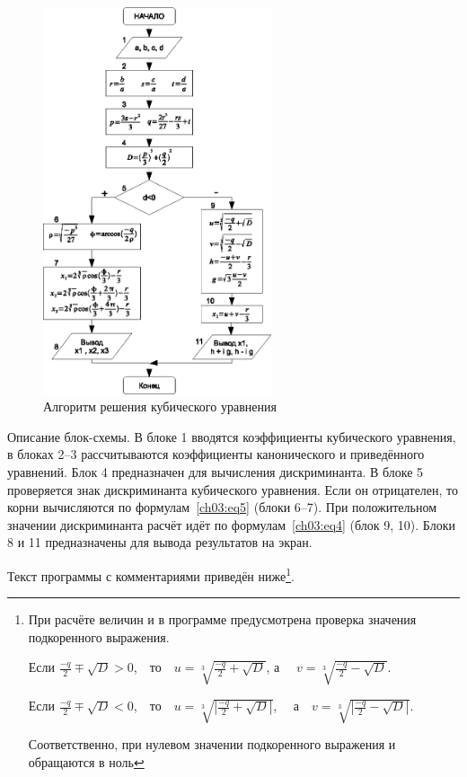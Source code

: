 \begin{figure}[ht]
\begin{center}
\includegraphics[width=0.6\textwidth]{img/ris_3_19}
\caption{Алгоритм решения кубического уравнения}
\label{ch03:refDrawing18}
\end{center}
\end{figure}

Описание блок-схемы. В блоке 1 вводятся коэффициенты кубического уравнения, в блоках 2--3 рассчитываются коэффициенты
канонического и приведённого уравнений. Блок 4 предназначен для вычисления дискриминанта. В блоке 5 проверяется знак
дискриминанта кубического уравнения. Если он отрицателен, то корни вычисляются по формулам~\ref{ch03:eq5} (блоки 6--7). При
положительном значении дискриминанта расчёт идёт по формулам~\ref{ch03:eq4} (блок 9, 10). Блоки 8 и 11 предназначены для вывода результатов на экран.

Текст программы с комментариями приведён ниже\footnote{При расчёте величин  и  в
программе предусмотрена проверка значения подкоренного выражения. 

Если  $\frac{-q}{2}\mp\sqrt{D}>0$,\ \ то\ \ $u=\sqrt[{3}]{\frac{-q}{2}+\sqrt{D}}$, 
а \ \ $v=\sqrt[{3}]{\frac{-q}{2}-\sqrt{D}}$.

Если  $\frac{-q}{2}\mp\sqrt{D}<0$,\ \ то\ \ $u=\sqrt[{3}]{|\frac{-q}{2}+\sqrt{D}|}$,
\ \  а\ \ $v=\sqrt[{3}]{|\frac{-q}{2}-\sqrt{D}|}$.

Соответственно, при нулевом значении подкоренного выражения  и  обращаются
в ноль}.

